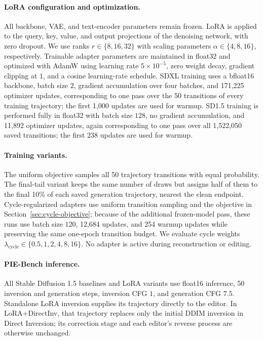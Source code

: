 \documentclass{article} %
\begin{document}
\paragraph{LoRA configuration and optimization.}
All backbone, VAE, and text-encoder parameters remain frozen. LoRA is applied to the query, key, value, and output projections of the denoising network, with zero dropout. We use ranks $r\in\{8,16,32\}$ with scaling parameters $\alpha\in\{4,8,16\}$, respectively. Trainable adapter parameters are maintained in float32 and optimized with AdamW using learning rate $5\times10^{-5}$, zero weight decay, gradient clipping at $1$, and a cosine learning-rate schedule. SDXL training uses a bfloat16 backbone, batch size $2$, gradient accumulation over four batches, and 171,225 optimizer updates, corresponding to one pass over the 50 transitions of every training trajectory; the first 1,000 updates are used for warmup. SD1.5 training is performed fully in float32 with batch size $128$, no gradient accumulation, and 11,892 optimizer updates, again corresponding to one pass over all 1,522,050 saved transitions; the first 238 updates are used for warmup.

\paragraph{Training variants.}
The uniform objective samples all 50 trajectory transitions with equal probability. The final-tail variant keeps the same number of draws but assigns half of them to the final 10\% of each saved generation trajectory, nearest the clean endpoint. Cycle-regularized adapters use uniform transition sampling and the objective in Section~\ref{sec:cycle-objective}; because of the additional frozen-model pass, these runs use batch size $120$, 12,684 updates, and 254 warmup updates while preserving the same one-epoch transition budget. We evaluate cycle weights $\lambda_{\mathrm{cycle}}\in\{0.5,1,2,4,8,16\}$. No adapter is active during reconstruction or editing.

\paragraph{PIE-Bench inference.}
All Stable Diffusion 1.5 baselines and LoRA variants use float16 inference, 50 inversion and generation steps, inversion CFG $1$, and generation CFG $7.5$. Standalone LoRA inversion supplies its trajectory directly to the editor. In LoRA+DirectInv, that trajectory replaces only the initial DDIM inversion in Direct Inversion; its correction stage and each editor's reverse process are otherwise unchanged.
\end{document}
